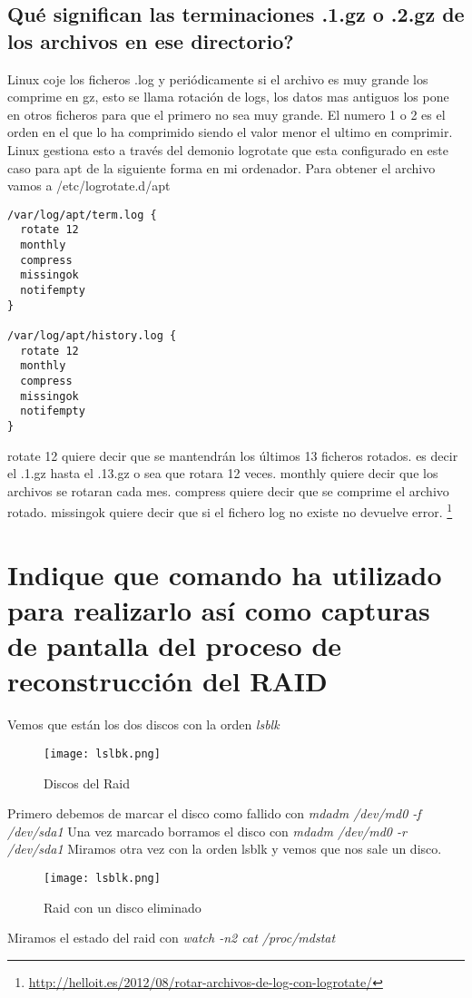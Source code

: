 \subsection{Qué significan las terminaciones .1.gz o .2.gz de los archivos en ese directorio?}
Linux coje los ficheros .log y periódicamente si el archivo es muy grande los comprime en gz, esto se llama rotación de logs, los datos mas antiguos los pone en otros ficheros para que el primero no sea muy grande. El numero 1 o 2 es el orden en el que lo ha comprimido siendo el valor menor el ultimo en comprimir. Linux gestiona esto a través del demonio logrotate que esta configurado en este caso para apt de la siguiente forma en mi ordenador. Para obtener el archivo vamos a /etc/logrotate.d/apt
\begin{verbatim}
/var/log/apt/term.log {
  rotate 12
  monthly
  compress
  missingok
  notifempty
}

/var/log/apt/history.log {
  rotate 12
  monthly
  compress
  missingok
  notifempty
}
\end{verbatim}
rotate 12 quiere decir que se mantendrán los últimos 13 ficheros rotados. es decir el .1.gz hasta el .13.gz o sea que rotara 12 veces. monthly quiere decir que los archivos se rotaran cada mes. compress quiere decir que se comprime el archivo rotado. missingok quiere decir que si el fichero log no existe no devuelve error. \footnote{\url{http://helloit.es/2012/08/rotar-archivos-de-log-con-logrotate/}}
\section{Indique que comando ha utilizado para realizarlo así como capturas de pantalla del proceso de reconstrucción del RAID}
Vemos que están los dos discos con la orden \textit{lsblk}
\begin{figure}[H] 
\centering
\texttt{[image: lslbk.png]}  
\label{figura1:}
\caption{Discos del Raid}
\end{figure}
Primero debemos de marcar el disco como fallido con
\textit{mdadm /dev/md0 -f /dev/sda1}
Una vez marcado borramos el disco con
\textit{mdadm /dev/md0 -r /dev/sda1}
Miramos otra vez con la orden lsblk y vemos que nos sale un disco.
\begin{figure}[H] 
\centering
\texttt{[image: lsblk.png]}  
\label{figura2:}
\caption{Raid con un disco eliminado}
\end{figure}
Miramos el estado del raid con \textit{watch -n2 cat /proc/mdstat}

